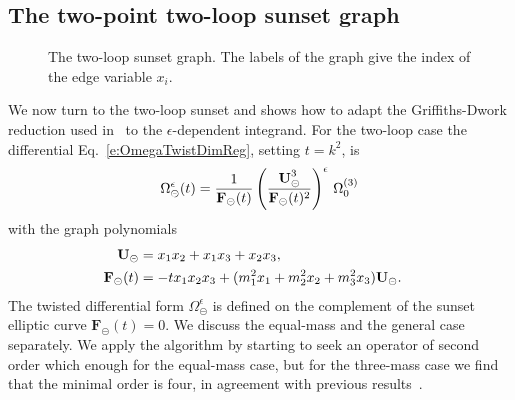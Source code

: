 \documentclass[a4paper,12pt]{article}
\numberwithin{equation}{section}
\numberwithin{figure}{section}
\def\su{\circleddash}
\begin{document}
\subsection{The two-point  two-loop sunset graph}
\label{sec:two-loop-case}
	\begin{figure}[ht]
		\centering
		\caption{The two-loop sunset graph.  The
          labels of the graph give the index of the edge variable $x_i$.}
		  \label{fig:sunset2loop}
	\end{figure}
%
We now turn to the two-loop sunset and shows how to adapt the
Griffiths-Dwork reduction used in~\cite{Bloch:2016izu,Lairez:2022zkj} to the $\epsilon$-dependent integrand. For the two-loop case the differential
Eq.~\eqref{e:OmegaTwistDimReg}, setting $t=k^2$, is
\begin{equation}\label{e:OmegaSunset}
  \Omega_{\su}^{\epsilon}(t)={1\over
    \textbf{F}_\su(t)}\left(\textbf{U}_\su^3\over \textbf{F}_\su(t)^2\right)^\epsilon  \,\Omega_0^{(3)}
\end{equation}
with the graph polynomials 
\begin{align}
 \textbf{U}_\su&=x_1x_2+x_1x_3+x_2x_3,\cr
  \textbf{F}_\su(t)&=-t x_1x_2x_3 + (m_1^2x_1+m_2^2x_2+m_3^2x_3) \textbf{U}_\su.
\end{align}
%
The twisted differential form $\Omega_\su^{\epsilon}$ is defined on the
complement of the sunset elliptic curve $\mathbf{F}_\su(t)=0$.
%
We discuss the equal-mass and the general case separately.
%
We apply the algorithm by starting to seek an operator of second order which enough for the equal-mass case, but for the
three-mass case we find that the minimal order is four, in
agreement with previous results~\cite{Caffo:1998du,Remiddi:2013joa,Adams:2013nia}.

\end{document}
